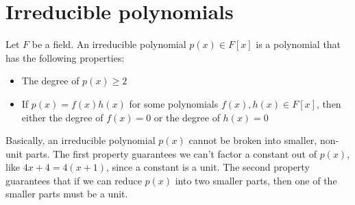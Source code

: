 \section{Irreducible polynomials}

\begin{definition}
Let $F$ be a field. An irreducible polynomial $p(x) \in F[x]$ is a polynomial that has the following properties:
\begin{itemize}
    \item The degree of $p(x) \geq 2$
    \item If $p(x) = f(x)h(x)$ for some polynomials $f(x), h(x) \in F[x]$, then either the degree of $f(x)=0$ or the degree of $h(x)=0$
\end{itemize}
\end{definition}

Basically, an irreducible polynomial $p(x)$ cannot be broken into smaller, non-unit parts. The first property guarantees we can't factor a constant out of $p(x)$, like $4x + 4 = 4(x+1)$, since a constant is a unit. The second property guarantees that if we can reduce $p(x)$ into two smaller parts, then one of the smaller parts must be a unit.




